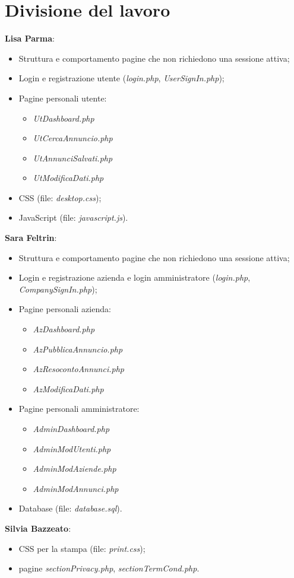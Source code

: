 \section{Divisione del lavoro}

	 \textbf{Lisa Parma}:
	\begin{itemize}
		\item Struttura e comportamento pagine che non richiedono una sessione attiva;
		\item Login e registrazione utente (\emph{login.php}, \emph{UserSignIn.php});
		\item Pagine personali utente:
		\begin{itemize}
			\item \emph{UtDashboard.php}
			\item \emph{UtCercaAnnuncio.php}
			\item \emph{UtAnnunciSalvati.php}
			\item \emph{UtModificaDati.php}
		\end{itemize}
		\item CSS (file: \emph{desktop.css});
		\item JavaScript (file: \emph{javascript.js}).
	\end{itemize}
  \vspace{15pt}
	 \textbf{Sara Feltrin}:
	\begin{itemize}
		\item Struttura e comportamento pagine che non richiedono una sessione attiva;
		\item Login e registrazione azienda e login amministratore (\emph{login.php}, \emph{CompanySignIn.php});
		\item Pagine personali azienda:
		\begin{itemize}
			\item \emph{AzDashboard.php}
			\item \emph{AzPubblicaAnnuncio.php}
			\item \emph{AzResocontoAnnunci.php}
			\item \emph{AzModificaDati.php}
		\end{itemize}
		\item Pagine personali amministratore:
		\begin{itemize}
			\item \emph{AdminDashboard.php}
			\item \emph{AdminModUtenti.php}
			\item \emph{AdminModAziende.php}
			\item \emph{AdminModAnnunci.php}
		\end{itemize}
	\item Database (file: \emph{database.sql}).
	\end{itemize}
  \vspace{15pt}
	 \textbf{Silvia Bazzeato}:
	\begin{itemize}
		\item CSS per la stampa (file: \emph{print.css});
		\item pagine \emph{sectionPrivacy.php}, \emph{sectionTermCond.php}.
	\end{itemize}



		


